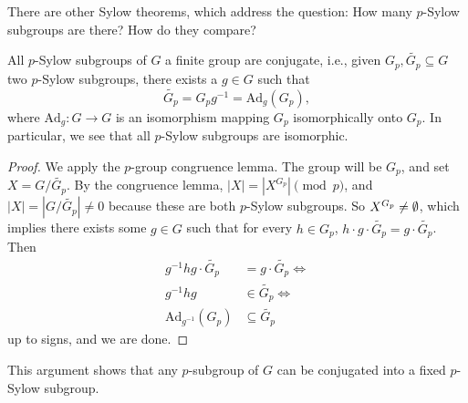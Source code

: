 There are other Sylow theorems, which address the question: How many $p$-Sylow subgroups are there? How do they compare?

\begin{theorem}[Sylow II]\label{sylow2} 
    All $p$-Sylow subgroups of $G$ a finite group are conjugate, i.e., given $G_p, \widetilde {G_p} \subseteq G$ two $p$-Sylow subgroups, there exists a $g \in G$ such that \[
        \widetilde {G_p} = G_p g^{-1}=\mathrm{Ad}_g(G_p),
    \] where $\mathrm{Ad}_g \colon G \to G$ is an isomorphism mapping $G_p$ isomorphically onto $G_p$. In particular, we see that all $p$-Sylow subgroups are isomorphic.
\end{theorem}
\begin{proof}
   We apply the $p$-group congruence lemma. The group will be $G_p$, and set $X = G / \widetilde {G_p} $. By the congruence lemma, $|X|=|X^{G_p}| \pmod p$, and $|X|=|G /\widetilde {G_p} | \neq 0$ because these are both $p$-Sylow subgroups. So $X^{G_p}\neq \emptyset$, which implies there exists some $g \in G$ such that for every $h \in G_p$, $h\cdot g\cdot \widetilde {G_p} =g\cdot \widetilde {G_p} $. Then 
   \begin{align*}
       g^{-1}hg \cdot \widetilde {G_p} &= g \cdot \widetilde {G_p} \iff \\
           g^{-1} h g & \in \widetilde {G_p} \iff \\
               \mathrm{Ad}_{g^{-1}}(G_p) & \subseteq \widetilde {G_p} 
   \end{align*}up to signs, and we are done.
\end{proof}
\begin{remark}
    This argument shows that any $p$-subgroup of $G$ can be conjugated into a fixed $p$-Sylow subgroup.
\end{remark}

